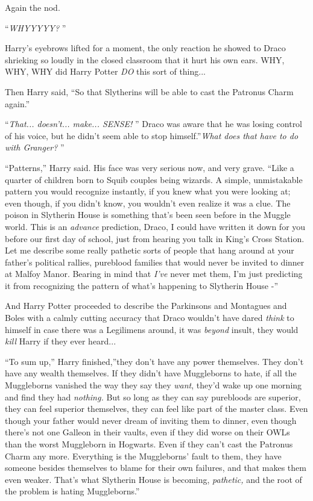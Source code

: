 Again the nod.

``\emph{WHYYYYY?} ''

Harry's eyebrows lifted for a moment, the only reaction he showed to
Draco shrieking so loudly in the closed classroom that it hurt his own
ears. WHY, WHY, WHY did Harry Potter \emph{DO} this sort of
thing...

Then Harry said, ``So that Slytherins will be able to cast the Patronus
Charm again.''

``\emph{That... doesn't... make... SENSE!} '' Draco was
aware that he was losing control of his voice, but he didn't seem able
to stop himself.''\emph{What does that have to do with Granger?} ''

``Patterns,'' Harry said. His face was very serious now, and very grave.
``Like a quarter of children born to Squib couples being wizards. A
simple, unmistakable pattern you would recognize instantly, if you knew
what you were looking at; even though, if you didn't know, you wouldn't
even realize it was a clue. The poison in Slytherin House is something
that's been seen before in the Muggle world. This is an \emph{advance}
prediction, Draco, I could have written it down for you before our first
day of school, just from hearing you talk in King's Cross Station. Let
me describe some really pathetic sorts of people that hang around at
your father's political rallies, pureblood families that would never be
invited to dinner at Malfoy Manor. Bearing in mind that \emph{I've}
never met them, I'm just predicting it from recognizing the pattern of
what's happening to Slytherin House -''

And Harry Potter proceeded to describe the Parkinsons and Montagues and
Boles with a calmly cutting accuracy that Draco wouldn't have dared
\emph{think} to himself in case there was a Legilimens around, it was
\emph{beyond} insult, they would \emph{kill} Harry if they ever
heard...

``To sum up,'' Harry finished,''they don't have any power themselves.
They don't have any wealth themselves. If they didn't have Muggleborns
to hate, if all the Muggleborns vanished the way they say they
\emph{want}, they'd wake up one morning and find they had
\emph{nothing.} But so long as they can say purebloods are superior,
they can feel superior themselves, they can feel like part of the master
class. Even though your father would never dream of inviting them to
dinner, even though there's not one Galleon in their vaults, even if
they did worse on their OWLs than the worst Muggleborn in Hogwarts. Even
if they can't cast the Patronus Charm any more. Everything is the
Muggleborns' fault to them, they have someone besides themselves to
blame for their own failures, and that makes them even weaker. That's
what Slytherin House is becoming, \emph{pathetic,} and the root of the
problem is hating Muggleborns.''

